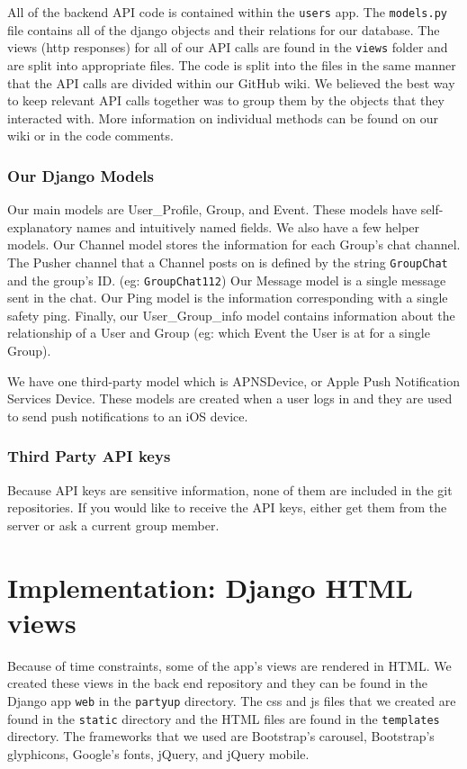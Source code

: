 \documentclass[12pt]{article}
\begin{document}
All of the backend API code is contained within the \texttt{users} app.
The \texttt{models.py} file contains all of the django objects and their relations for our database. 
The views (http responses) for all of our API calls are found in the \texttt{views} folder and are split into appropriate files.
The code is split into the files in the same manner that the API calls are divided within our GitHub wiki. 
We believed the best way to keep relevant API calls together was to group them by the objects that they interacted with. 
More information on individual methods can be found on our wiki or in the code comments.

\subsubsection{Our Django Models}

Our main models are User\_Profile, Group, and Event. 
These models have self-explanatory names and intuitively named fields. 
We also have a few helper models. 
Our Channel model stores the information for each Group's chat channel. 
The Pusher channel that a Channel posts on is defined by the string \texttt{GroupChat} and the group's ID. (eg: \texttt{GroupChat112}) 
Our Message model is a single message sent in the chat. 
Our Ping model is the information corresponding with a single safety ping. 
Finally, our User\_Group\_info model contains information about the relationship of a User and Group (eg: which Event the User is at for a single Group).

We have one third-party model which is APNSDevice, or Apple Push Notification Services Device. 
These models are created when a user logs in and they are used to send push notifications to an iOS device.

\subsubsection{Third Party API keys}

Because API keys are sensitive information, none of them are included in the git repositories. 
If you would like to receive the API keys, either get them from the server or ask a current group member.

\section{Implementation: Django HTML views}

Because of time constraints, some of the app's views are rendered in HTML. We created these views in the back end repository and they can be found in the Django app \texttt{web} in the \texttt{partyup} directory. The css and js files that we created are found in the  \texttt{static} directory and the HTML files are found in the  \texttt{templates} directory. The frameworks that we used are Bootstrap's carousel, Bootstrap's glyphicons, Google's fonts, jQuery, and jQuery mobile. 
\end{document}
